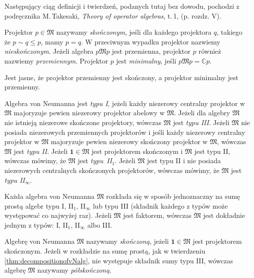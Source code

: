 Następujący ciąg definicji i twierdzeń, podanych tutaj bez dowodu,
pochodzi z podręcznika M.\,Takesaki, \emph{Theory of operator algebras}, t.\,1,
\cite{Takesaki1} (p. rozdz. V).

\begin{Definition}
    \label{def:projectionsInvN}
    Projektor $p \in \mathfrak{M}$ nazywamy \emph{skończonym}, jeśli
    dla każdego projektora $q$, takiego że $p \sim q \leq p$, mamy $p = q$.
    W przeciwnym wypadku projektor nazwiemy \emph{nieskończonym}.
    Jeżeli algebra $p \mathfrak{M} p$ jest przemienna,
    projektor $p$ również nazwiemy \emph{przemiennym}.
    Projektor $p$ jest \emph{minimalny}, jeśli $p \mathfrak{M} p = \mathbb{C} p$.
\end{Definition}

Jest jasne, że projektor przemienny jest skończony, a projektor minimalny jest przemienny.

\begin{Definition}
    \label{def:typesofvNalg}
    Algebra von Neumanna jest \emph{typu I}, jeżeli każdy niezerowy centralny
    projektor w $\mathfrak{M}$ majoryzuje pewien niezerowy projektor abelowy
    w $\mathfrak{M}$.
    Jeżeli dla algebry $\mathfrak{M}$ nie istnieją niezerowe skończone projektory,
    wówczas $\mathfrak{M}$ jest \emph{typu III}.
    Jeżeli $\mathfrak{M}$ nie posiada niezerowych przemiennych projektorów
    i jeśli każdy niezerowy centralny projektor w $\mathfrak{M}$ majoryzuje
    pewien niezerowy skończony projektor w $\mathfrak{M}$, wówczas
    $\mathfrak{M}$ jest \emph{typu II}.
    Jeżeli $\mathbf{1} \in \mathfrak{M}$ jest projektorem skończonym i
    $\mathfrak{M}$ jest typu II, wówczas mówimy, że $\mathfrak{M}$ jest
    \mbox{\emph{typu II$_{1}$}}.
    Jeżeli $\mathfrak{M}$ jest typu II i nie posiada niezerowych centralnych skończonych
    projektorów, wówczas mówimy, że $\mathfrak{M}$ jest \emph{typu II$_{\infty}$}.
\end{Definition}

\begin{Theorem}
    \label{thm:decompositionofvNalg}
    Każda algebra von Neumanna $\mathfrak{M}$ rozkłada się w sposób
    jednoznaczny na sumę prostą algebr typu I, II$_{1}$, II$_{\infty}$ lub typu III
    (składnik każdego z typów może występować co najwyżej raz).
    Jeżeli $\mathfrak{M}$ jest faktorem, wówczas $\mathfrak{M}$ jest dokładnie
    jednym z typów: I, II$_{1}$, II$_{\infty}$ albo III.
\end{Theorem}

\begin{Definition}
    \label{def:semifinitevNalg}
    Algebrę von Neumanna $\mathfrak{M}$ nazywamy \emph{skończoną}, jeżeli
    \mbox{$\mathbf{1} \in \mathfrak{M}$} jest projektorem skończonym.
    Jeżeli w rozkładzie na sumę prostą, jak w twierdzeniu \ref{thm:decompositionofvNalg},
    nie występuje składnik sumy typu III,
    wówczas algebrę $\mathfrak{M}$ nazywamy \emph{półskończoną}.
\end{Definition}

